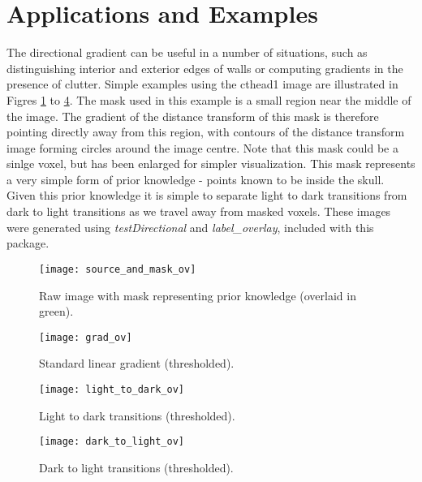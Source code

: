 \documentclass{InsightArticle}
\begin{document}
\section{Applications and Examples}
The directional gradient can be useful in a number of situations, such
as distinguishing interior and exterior edges of walls or computing
gradients in the presence of clutter. Simple examples using the
cthead1 image are illustrated in Figres \ref{fig:source_and_mask} to
\ref {fig:dl}. The mask used in this example is a small region near
the middle of the image. The gradient of the distance transform of
this mask is therefore pointing directly away from this region, with
contours of the distance transform image forming circles around the
image centre. Note that this mask could be a sinlge voxel, but has
been enlarged for simpler visualization. This mask represents a very
simple form of prior knowledge - points known to be inside the
skull. Given this prior knowledge it is simple to separate light to
dark transitions from dark to light transitions as we travel away from
masked voxels. These images were generated using {\em testDirectional}
and {\em label\_overlay}, included with this package.

\begin{figure}[htbp]
\centering
\texttt{[image: source\_and\_mask\_ov]}
\caption{Raw image with mask representing prior knowledge (overlaid in green).\label{fig:source_and_mask}}
\end{figure}

\begin{figure}[htbp]
\centering
\texttt{[image: grad\_ov]}
\caption{Standard linear gradient (thresholded).\label{fig:grad}}
\end{figure}

\begin{figure}[htbp]
\centering
\texttt{[image: light\_to\_dark\_ov]}
\caption{Light to dark transitions (thresholded).\label{fig:ld}}
\end{figure}

\begin{figure}[htbp]
\centering
\texttt{[image: dark\_to\_light\_ov]}
\caption{Dark to light transitions (thresholded).\label{fig:dl}}
\end{figure}
\end{document}
